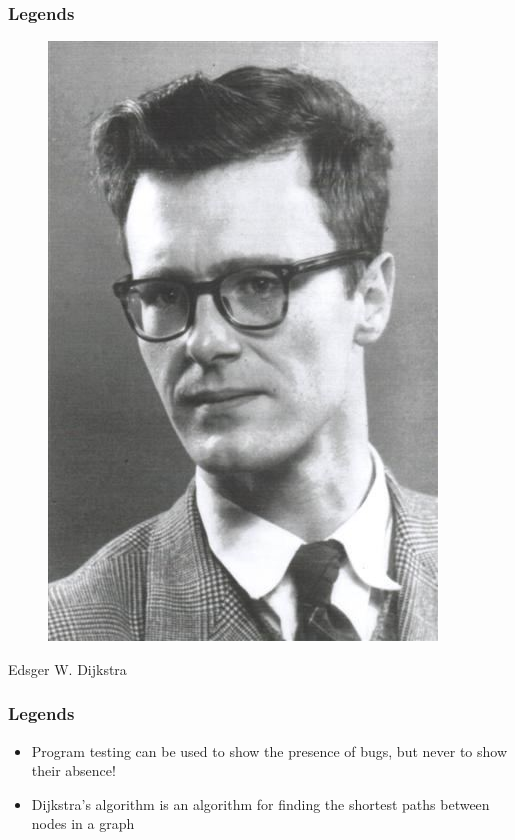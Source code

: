 \documentclass{../c-lecture}
\begin{document}
\begin{frame}
  \frametitle{Legends}
  \begin{figure}
    \includegraphics[height=.75\textheight]{./img/dijkstra.jpg}
  \end{figure}
  \pause%
  \centering
  \color{Violet} Edsger W. Dijkstra
\end{frame}

\begin{frame}
  \frametitle{Legends}
  \begin{itemize}
    \item
      Program testing can be used to show the presence of bugs, but never to
      show their absence!

    \item
      Dijkstra's algorithm is an algorithm for finding the shortest paths
      between nodes in a graph

  \end{itemize}
\end{frame}
\end{document}
